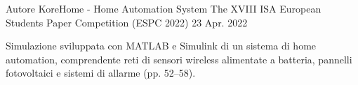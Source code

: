 

\begin{cventries}

  \cventry
    {Autore} %
    {KoreHome - Home Automation System} %
    {The XVIII ISA European Students Paper Competition (ESPC 2022)} %
    {23 Apr. 2022} %
    {
      \begin{cvitems}
        \item {Simulazione sviluppata con MATLAB e Simulink di un sistema di home automation, comprendente reti di sensori wireless alimentate a batteria, pannelli fotovoltaici e sistemi di allarme (pp. 52--58).}
        \\
      \end{cvitems}
    }

\end{cventries}